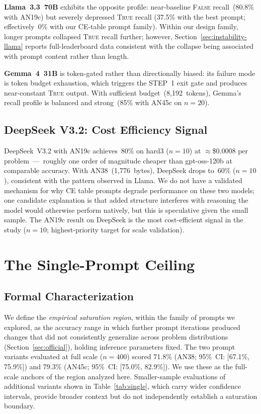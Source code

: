 \documentclass[11pt]{article}
\begin{document}
\textbf{Llama~3.3~70B} exhibits the opposite profile: near-baseline
\textsc{False} recall~(80.8\% with AN19c) but severely depressed
\textsc{True} recall (37.5\% with the best prompt; effectively~0\%
with our CE-table prompt family). Within our design family, longer
prompts collapsed \textsc{True} recall further; however,
Section~\ref{sec:instability-llama} reports full-leaderboard data
consistent with the collapse being associated with prompt content rather
than length.

\textbf{Gemma~4~31B} is token-gated rather than directionally biased:
its failure mode is token budget exhaustion, which triggers the STEP~1
exit gate and produces near-constant \textsc{True} output. With
sufficient budget~(8{,}192~tokens), Gemma's recall profile is balanced
and strong~(85\% with AN45c on $n=20$).

\subsection{DeepSeek V3.2: Cost Efficiency Signal}

DeepSeek~V3.2 with AN19c achieves~80\% on hard3 ($n=10$) at
$\approx$\$0.0008 per problem~---~roughly one order of magnitude cheaper
than gpt-oss-120b at comparable accuracy. With AN38~(1{,}776~bytes),
DeepSeek drops to~60\% ($n=10$), consistent with the pattern observed in
Llama. We do not have a validated mechanism for why CE table prompts
degrade performance on these two models; one candidate explanation is
that added structure interferes with reasoning the model would otherwise
perform natively, but this is speculative given the small sample. The AN19c
result on DeepSeek is the most cost-efficient signal in the study
($n=10$; highest-priority target for scale validation).

\section{The Single-Prompt Ceiling}
\label{sec:ceiling}

\subsection{Formal Characterization}

We define the \emph{empirical saturation region}, within the family
of prompts we explored, as the accuracy range in which further prompt
iterations produced changes that did not consistently generalize
across problem distributions (Section~\ref{sec:official}), holding
inference parameters fixed. The two prompt variants evaluated at full
scale ($n=400$) scored 71.8\% (AN38; 95\%~CI: [67.1\%, 75.9\%]) and
79.3\% (AN45c; 95\%~CI: [75.0\%, 82.9\%]). We use these as the
full-scale anchors of the region analyzed here. Smaller-sample
evaluations of additional variants shown in Table~\ref{tab:single},
which carry wider confidence intervals, provide broader context but do
not independently establish a saturation boundary.
\end{document}
